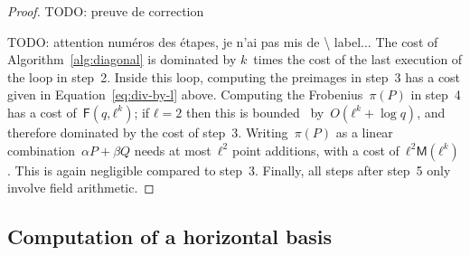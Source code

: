 \documentclass{lms}
\newcommand{\todo}[1]{{\color{red}TODO: #1}}
\def\cout#1{\mathsf{#1}}
\begin{document}
\begin{proof}
\todo{preuve de correction}

\todo{attention numéros des étapes, je n'ai pas mis de \textbackslash
label...}
The cost of Algorithm~\ref{alg:diagonal} is dominated
by $k$~times the cost of the last execution of the loop in step~2.
Inside this loop, computing the preimages in step~3 has a cost given in
Equation~\ref{eq:div-by-l} above.
Computing the Frobenius~$π(P)$ in step~4 has a cost of~$\cout{F}(q, ℓ^k)$;
if $ℓ = 2$ then this is bounded~\cite[2.3]{DoSc12}
by~$O(ℓ^k + \log q)$, and therefore dominated by the cost of step~3.
Writing~$π(P)$ as a linear combination~$α P + β Q$
needs at most~$ℓ^2$ point additions, with a cost of~$ℓ^2 \cout{M}(ℓ^k)$.
This is again negligible compared to step~3.
Finally, all steps after step~5 only involve field arithmetic.

% 
\end{proof}

\subsection{Computation of a horizontal basis}
\label{ss:horizontal}
\end{document}
